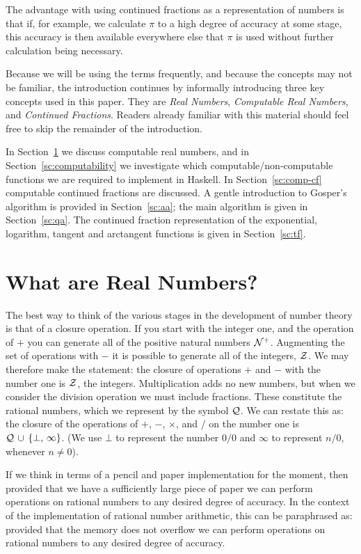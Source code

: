 The advantage with using continued fractions as a representation of
numbers is that if, for example, we calculate $\pi$ to a high degree
of accuracy at some stage, this accuracy is then available everywhere
else that $\pi$ is used without further calculation being necessary.

Because we will be using the terms frequently, and because the
concepts may not be familiar, the introduction continues by informally
introducing three key concepts used in this paper. They are {\em Real
Numbers}, {\em Computable Real Numbers}, and {\em Continued
Fractions}. Readers already familiar with this material should feel
free to skip the remainder of the introduction.

In Section~\ref{sc:reals} we discuss computable real numbers, and in
Section~\ref{sc:computability} we investigate which
computable/non-computable functions we are required to implement in
{\sc Haskell}. In Section~\ref{sc:comp-cf} computable continued
fractions are discussed.  A gentle introduction to Gosper's algorithm
is provided in Section~\ref{sc:aa}; the main algorithm is given in
Section~\ref{sc:qa}. The continued fraction representation of the
exponential, logarithm, tangent and arctangent functions is given in
Section~\ref{sc:tf}.

\section{What are Real Numbers?}
\label{sc:reals}

The best way to think of the various stages in the development of
number theory is that of a closure operation. If you start with the
integer one, and the operation of $+$ you can generate all of the
positive natural numbers ${\cal N}^{+}$. Augmenting the set of
operations with $-$ it is possible to generate all of the integers,
${\cal Z}$. We may therefore make the statement: the closure of
operations $+$ and $-$ with the number one is ${\cal Z}$, the
integers. Multiplication adds no new numbers, but when we consider the
division operation we must include fractions. These constitute the
rational numbers, which we represent by the symbol ${\cal Q}$. We can
restate this as: the closure of the operations of $+$, $-$, $\times$,
and $/$ on the number one is ${\cal Q}\,\cup\,\{\bot,\,\infty\}$.
(We use $\bot$ to represent the number $0/0$ and $\infty$ to
represent $n/0$, whenever $n\not=0$).

If we think in terms of a pencil and paper implementation for the
moment, then provided that we have a sufficiently large piece of paper
we can perform operations on rational numbers to any desired degree of
accuracy. In the context of the implementation of rational number
arithmetic, this can be paraphrased as: provided that the memory does
not overflow we can perform operations on rational numbers to any
desired degree of accuracy.

